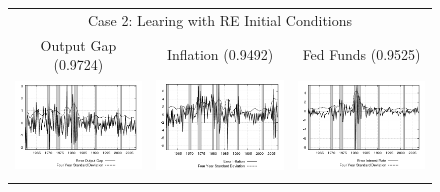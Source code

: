 \begin{figure}
\begin{tabular}{ccc}
\multicolumn{3}{c}{Case 2: Learing with RE Initial Conditions} \\ 
Output Gap (0.9724) & Inflation (0.9492) & Fed Funds (0.9525) \\
\includegraphics[scale=0.28]{results_reallinit/output_err.png} & 
\includegraphics[scale=0.28]{results_reallinit/inflation_err.png} & 
\includegraphics[scale=0.28]{results_reallinit/fedfunds_err.png} \\ \\ 
 

\end{tabular}
\end{figure}
